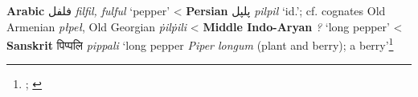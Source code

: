 \begin{etymology}\label{ety:fulful}
\textbf{Arabic} {فلفل} \textit{filfil, fulful} `pepper'
< \textbf{Persian} {پلپل} \textit{pilpil} `id.'; cf. cognates Old Armenian  \textit{płpeł}, Old Georgian  \textit{ṗilṗili}
< \textbf{Middle Indo-Aryan} \textit{?} `long pepper'
< \textbf{Sanskrit} {पिप्पलि} \textit{pippali} `long pepper \textit{Piper longum} (plant and berry); a berry'\footnote{\textcite[2434]{lane_arabic-english_1863}; \textcite{sq}}
\end{etymology}